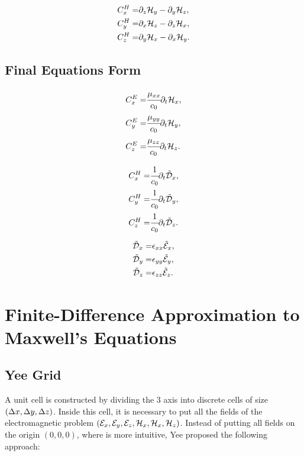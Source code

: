 \begin{eqnarray}
    C_x^H =& \partial_z\mathcal{H}_y - \partial_y\mathcal{H}_z, \\
    C_y^H =& \partial_x\mathcal{H}_z - \partial_z\mathcal{H}_x, \\
    C_z^H =& \partial_y\mathcal{H}_x - \partial_x\mathcal{H}_y.
\end{eqnarray}

\subsection{Final Equations Form}

\begin{eqnarray}
    C_x^E =& \cfrac{\mu_{xx}}{c_0} \partial_t \mathcal{H}_x, \\
    C_y^E =& \cfrac{\mu_{yy}}{c_0} \partial_t \mathcal{H}_y,\\
    C_z^E =& \cfrac{\mu_{zz}}{c_0} \partial_t \mathcal{H}_z.
\end{eqnarray}

\begin{eqnarray}
    C_x^H =& \cfrac{1}{c_0} \partial_t \tilde{\mathcal{D}}_x, \\
    C_y^H =& \cfrac{1}{c_0} \partial_t \tilde{\mathcal{D}}_y, \\
    C_z^H =& \cfrac{1}{c_0} \partial_t \tilde{\mathcal{D}}_z.
\end{eqnarray}

\begin{eqnarray}
    \tilde{\mathcal{D}}_x =& \epsilon_{xx} \tilde{\mathcal{E}}_x, \\
    \tilde{\mathcal{D}}_y =& \epsilon_{yy} \tilde{\mathcal{E}}_y, \\
    \tilde{\mathcal{D}}_z =& \epsilon_{zz} \tilde{\mathcal{E}}_z.
\end{eqnarray}


\section{Finite-Difference Approximation to Maxwell's Equations}

\subsection{Yee Grid}
A unit cell is constructed by dividing the 3 axis into discrete cells of size $(\Delta x, \Delta y, \Delta z)$. Inside this cell, it is necessary to put all the fields of the electromagnetic problem $(\mathcal{E}_x, \mathcal{E}_y, \mathcal{E}_z, \mathcal{H}_x, \mathcal{H}_x, \mathcal{H}_z)$. Instead of putting all fields on the origin $(0, 0, 0)$, where is more intuitive, Yee proposed the following approach:




